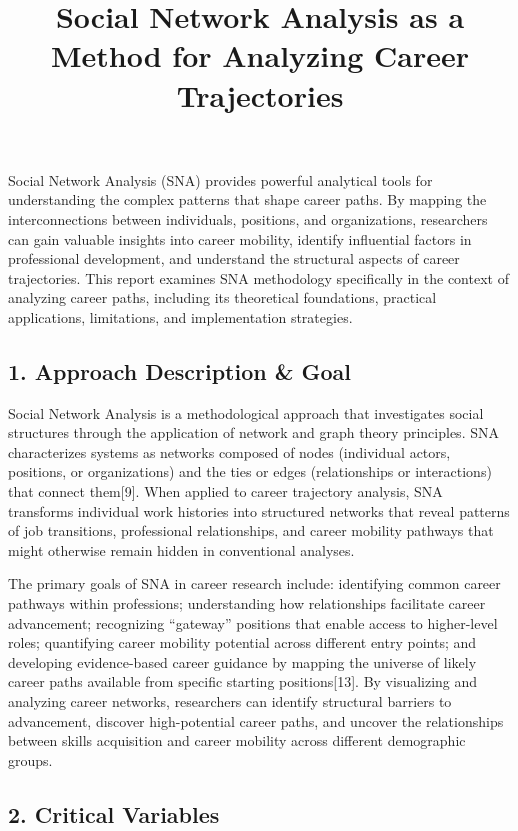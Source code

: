 \documentclass[
  letterpaper,
  DIV=11,
  numbers=noendperiod]{scrartcl}
\title{Social Network Analysis as a Method for Analyzing Career
Trajectories}
\author{}
\date{}
\begin{document}
\maketitle


Social Network Analysis (SNA) provides powerful analytical tools for
understanding the complex patterns that shape career paths. By mapping
the interconnections between individuals, positions, and organizations,
researchers can gain valuable insights into career mobility, identify
influential factors in professional development, and understand the
structural aspects of career trajectories. This report examines SNA
methodology specifically in the context of analyzing career paths,
including its theoretical foundations, practical applications,
limitations, and implementation strategies.

\subsection{1. Approach Description \&
Goal}\label{approach-description-goal}

Social Network Analysis is a methodological approach that investigates
social structures through the application of network and graph theory
principles. SNA characterizes systems as networks composed of nodes
(individual actors, positions, or organizations) and the ties or edges
(relationships or interactions) that connect them{[}9{]}. When applied
to career trajectory analysis, SNA transforms individual work histories
into structured networks that reveal patterns of job transitions,
professional relationships, and career mobility pathways that might
otherwise remain hidden in conventional analyses.

The primary goals of SNA in career research include: identifying common
career pathways within professions; understanding how relationships
facilitate career advancement; recognizing ``gateway'' positions that
enable access to higher-level roles; quantifying career mobility
potential across different entry points; and developing evidence-based
career guidance by mapping the universe of likely career paths available
from specific starting positions{[}13{]}. By visualizing and analyzing
career networks, researchers can identify structural barriers to
advancement, discover high-potential career paths, and uncover the
relationships between skills acquisition and career mobility across
different demographic groups.

\subsection{2. Critical Variables}\label{critical-variables}
\end{document}
